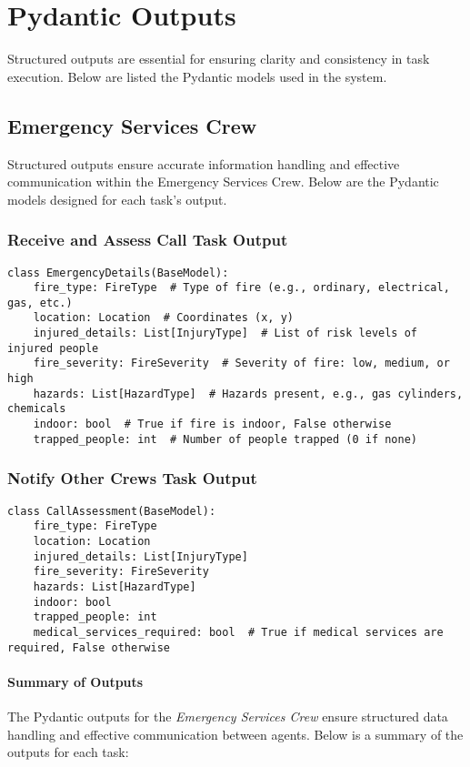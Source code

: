 \section{Pydantic Outputs}
Structured outputs are essential for ensuring clarity and consistency in task execution. Below are listed the Pydantic models used in the system.

\subsection{Emergency Services Crew}
Structured outputs ensure accurate information handling and effective communication within the Emergency Services Crew. Below 
are the Pydantic models designed for each task's output.

\subsubsection{Receive and Assess Call Task Output}
\begin{lstlisting}[caption={Pydantic model for Receive and Assess Call Task Output}] 
class EmergencyDetails(BaseModel):
    fire_type: FireType  # Type of fire (e.g., ordinary, electrical, gas, etc.)
    location: Location  # Coordinates (x, y)
    injured_details: List[InjuryType]  # List of risk levels of injured people
    fire_severity: FireSeverity  # Severity of fire: low, medium, or high
    hazards: List[HazardType]  # Hazards present, e.g., gas cylinders, chemicals
    indoor: bool  # True if fire is indoor, False otherwise
    trapped_people: int  # Number of people trapped (0 if none)
\end{lstlisting}

\subsubsection{Notify Other Crews Task Output}
\begin{lstlisting}[caption={Pydantic model for Notify Other Crews Task Output}] 
class CallAssessment(BaseModel):
    fire_type: FireType
    location: Location
    injured_details: List[InjuryType]
    fire_severity: FireSeverity
    hazards: List[HazardType]
    indoor: bool
    trapped_people: int
    medical_services_required: bool  # True if medical services are required, False otherwise
\end{lstlisting}

\paragraph{Summary of Outputs}
The Pydantic outputs for the \textit{Emergency Services Crew} ensure structured data handling and effective communication between agents. Below is a summary of the outputs for each task:

